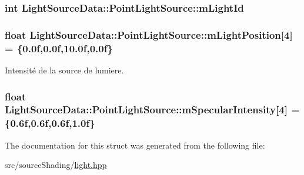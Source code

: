 \hypertarget{struct_light_source_data_1_1_point_light_source_af1e590645aa46ca01388ee4204f17eb7}{
\subsubsection[{m\+Light\+Id}]{\setlength{\rightskip}{0pt plus 5cm}int Light\+Source\+Data\+::\+Point\+Light\+Source\+::m\+Light\+Id}}\label{struct_light_source_data_1_1_point_light_source_af1e590645aa46ca01388ee4204f17eb7}
\hypertarget{struct_light_source_data_1_1_point_light_source_a54b8bcb5e6c8779065b39137b54e7a4a}{
\subsubsection[{m\+Light\+Position}]{\setlength{\rightskip}{0pt plus 5cm}float Light\+Source\+Data\+::\+Point\+Light\+Source\+::m\+Light\+Position\mbox{[}4\mbox{]} = \{0.\+0f,0.\+0f,10.\+0f,0.\+0f\}}}\label{struct_light_source_data_1_1_point_light_source_a54b8bcb5e6c8779065b39137b54e7a4a}


Intensité de la source de lumiere. 

\hypertarget{struct_light_source_data_1_1_point_light_source_ad561b4571eac75209782dd6a5ac2cabd}{
\subsubsection[{m\+Specular\+Intensity}]{\setlength{\rightskip}{0pt plus 5cm}float Light\+Source\+Data\+::\+Point\+Light\+Source\+::m\+Specular\+Intensity\mbox{[}4\mbox{]} = \{0.\+6f,0.\+6f,0.\+6f,1.\+0f\}}}\label{struct_light_source_data_1_1_point_light_source_ad561b4571eac75209782dd6a5ac2cabd}


The documentation for this struct was generated from the following file\+:\begin{DoxyCompactItemize}
\item 
src/source\+Shading/\hyperlink{light_8hpp}{light.\+hpp}\end{DoxyCompactItemize}

